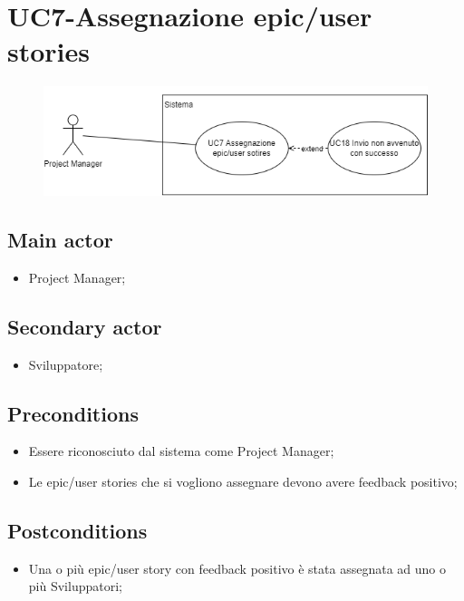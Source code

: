 \documentclass{article}
\begin{document}
\section{UC7-Assegnazione epic/user stories}
    \begin{figure}[h]
      \centering
      \includegraphics{./imgUML/UC7.png}
      \label{fig:immagine}
    \end{figure}

    \subsection*{Main actor}
    \begin{itemize}
        \item Project Manager;
    \end{itemize}
    
    \subsection*{Secondary actor}
    \begin{itemize}
        \item Sviluppatore;
    \end{itemize}
    
    \subsection*{Preconditions}
        \begin{itemize}
            \item Essere riconosciuto dal sistema come Project Manager;
            \item Le epic/user stories che si vogliono assegnare devono avere feedback positivo;
        \end{itemize}
        
    \subsection*{Postconditions}
        \begin{itemize}
            \item Una o più epic/user story con feedback positivo è stata assegnata ad uno o più Sviluppatori;
        \end{itemize}
    
\end{document}
